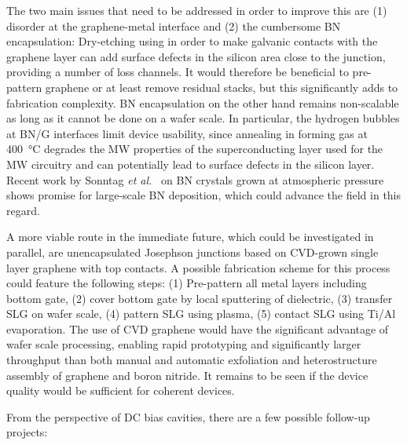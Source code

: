 The two main issues that need to be addressed in order to improve this are (1) disorder at the graphene-metal interface and (2) the cumbersome BN encapsulation:
%
Dry-etching using  in order to make galvanic contacts with the graphene layer can add surface defects in the silicon area close to the junction, providing a number of loss channels.
%
It would therefore be beneficial to pre-pattern graphene or at least remove residual stacks, but this significantly adds to fabrication complexity.
%
BN encapsulation on the other hand remains non-scalable as long as it cannot be done on a wafer scale.
%
In particular, the hydrogen bubbles at BN/G interfaces limit device usability, since annealing in forming gas at \SI{400}{\celsius} degrades the MW properties of the superconducting layer used for the MW circuitry and can potentially lead to surface defects in the silicon layer.
%
Recent work by Sonntag \textit{et al.}~\cite{sonntagExcellentElectronicTransport2020} on BN crystals grown at atmospheric pressure shows promise for large-scale BN deposition, which could advance the field in this regard.

A more viable route in the immediate future, which could be investigated in parallel, are unencapsulated Josephson junctions based on CVD-grown single layer graphene with top contacts.
%
A possible fabrication scheme for this process could feature the following steps:
%
(1) Pre-pattern all metal layers including bottom gate, (2) cover bottom gate by local sputtering of dielectric, (3) transfer SLG on wafer scale, (4) pattern SLG using  plasma, (5) contact SLG using Ti/Al evaporation.
%
The use of CVD graphene would have the significant advantage of wafer scale processing, enabling rapid prototyping and significantly larger throughput than both manual and automatic exfoliation and heterostructure assembly of graphene and boron nitride.
%
It remains to be seen if the device quality would be sufficient for coherent devices.


From the perspective of DC bias cavities, there are a few possible follow-up projects:

